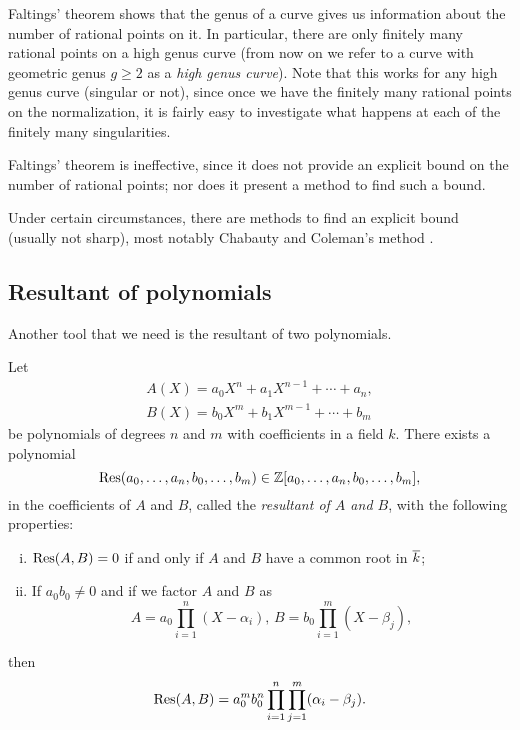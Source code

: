 Faltings' theorem shows that the genus of a curve gives us information
about the number of rational points on it. In particular, there are
only finitely many rational points on a high genus curve (from now on
we refer to a curve with geometric genus $g \ge 2$ as a \emph{high
  genus curve}). Note that this works for any high genus curve
(singular or not), since once we have the finitely many rational
points on the normalization, it is fairly easy to investigate what
happens at each of the finitely many singularities.

\begin{remark}
  Faltings' theorem is ineffective, since it does not provide an
  explicit bound on the number of rational points; nor does it present
  a method to find such a bound.

  Under certain circumstances, there are methods to find an explicit
  bound (usually not sharp), most notably Chabauty and Coleman's
  method \cite{MR808103}.
\end{remark}

\subsection{Resultant of polynomials}

Another tool that we need is the resultant of two polynomials.

\begin{proposition}
  \label{prop:res}
  Let
  \[
  \begin{gathered}
    A(X) = a_0 X^n + a_1 X^{n-1} + \cdots + a_n,\\
    B(X) = b_0 X^m + b_1 X^{m-1} + \cdots + b_m
  \end{gathered}
  \]
  be polynomials of degrees $n$ and $m$ with coefficients
  in a field $k$. There exists a polynomial
  \[
  \mathrm{Res}(a_0, \dots, a_n, b_0, \dots, b_m) \in \mathbb{Z}[a_0, \dots, a_n, b_0,
  \dots, b_m],
  \]
  in the coefficients of $A$ and $B$, called the \emph{resultant of
    $A$ and $B$}, with the following properties:
  \begin{enumerate}[(i)]
  \item $\mathrm{Res}(A, B) = 0$ if and only if $A$ and $B$ have a common root
    in $\overline{k}$;

  \item If $a_0 b_0 \ne 0$ and if we factor $A$ and $B$ as
    \[
    A = a_0 \prod_{i=1}^n (X - \alpha_i),\,
    B = b_0 \prod_{i=1}^m (X - \beta_j),
    \]
  \end{enumerate}
  then
  \[
  \mathrm{Res}(A, B) = a_0^m b_0^n \prod_{i=1}^n \prod_{j=1}^m (\alpha_i -
  \beta_j).
  \]
\end{proposition}

